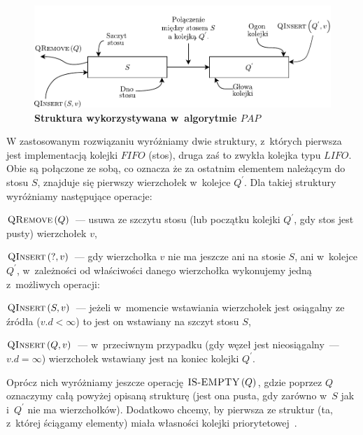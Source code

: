 \begin{figure}[!htbp]
	\centering
	\null\hfill
	\includegraphics[width=\textwidth]{Chapter_III/GRAPH-GROWTH-1Q-Other/a.pdf}
	\hfill\null
	\caption{
		\textbf{Struktura wykorzystywana w~algorytmie $PAP$}
	}
	\label{fig:examplePAPStructure}
\end{figure}

W zastosowanym rozwiązaniu wyróżniamy dwie struktury, z~których pierwsza jest implementacją kolejki $FIFO$ (stos), druga zaś to zwykła kolejka typu $LIFO$.
Obie są połączone ze sobą, co oznacza że za ostatnim elementem należącym do stosu $S$, znajduje się pierwszy wierzchołek w~kolejce $Q^{'}$.
Dla takiej struktury wyróżniamy następujące operacje:

\begin{myitemize}
	\item $\textrm{\textsc{QRemove}} \left( Q \right)$~--- usuwa ze szczytu stosu (lub początku kolejki $Q^{'}$, gdy stos jest pusty) wierzchołek $v$,
	\item $\textrm{\textsc{QInsert}} \left( ?, v \right)$~--- gdy wierzchołka $v$ nie ma jeszcze ani na stosie $S$, ani w~kolejce $Q^{'}$, w~zależności od właściwości danego wierzchołka wykonujemy jedną z~możliwych operacji:
	\begin{myitemize}
		\item $\textrm{\textsc{QInsert}} \left( S, v \right)$~--- jeżeli w~momencie wstawiania wierzchołek jest osiągalny ze źródła ($v.d < \infty$) to jest on wstawiany na szczyt stosu $S$,
		\item $\textrm{\textsc{QInsert}} \left( Q, v \right)$~--- w~przeciwnym przypadku (gdy węzeł jest nieosiągalny~--- $v.d = \infty$) wierzchołek wstawiany jest na koniec kolejki $Q^{'}$.
	\end{myitemize}
\end{myitemize}

Oprócz nich wyróżniamy jeszcze operację $\textrm{\textsc{IS-EMPTY}} \left( Q \right)$, gdzie poprzez $Q$ oznaczymy całą powyżej opisaną strukturę (jest ona pusta, gdy zarówno w~$S$ jak i~$Q^{'}$ nie ma wierzchołków).
Dodatkowo chcemy, by pierwsza ze struktur (ta, z~której ściągamy elementy) miała własności kolejki priorytetowej~\cite[$4.77$--$78$]{GIDA}.


